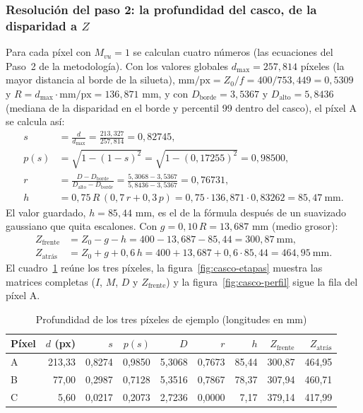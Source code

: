 \subsubsection{Resolución del paso 2: la profundidad del casco, de la disparidad a $Z$}\label{sec:casco-profundidad}

Para cada píxel con $M_{vu}=1$ se calculan cuatro números (las ecuaciones del Paso~2 de la metodología). Con los
valores globales $d_{\max}=257{,}814$ píxeles (la mayor distancia al borde de la silueta),
$\text{mm/px}=Z_0/f=400/753{,}449=0{,}5309$ y $R=d_{\max}\cdot\text{mm/px}=136{,}871$ mm, y con
$D_{\text{borde}}=3{,}5367$ y $D_{\text{alto}}=5{,}8436$ (mediana de la disparidad en el borde y percentil 99 dentro del casco),
el píxel A se calcula así:
\begin{align*}
s&=\frac{d}{d_{\max}}=\frac{213{,}327}{257{,}814}=0{,}82745,\\
p(s)&=\sqrt{1-(1-s)^2}=\sqrt{1-(0{,}17255)^2}=0{,}98500,\\
r&=\frac{D-D_{\text{borde}}}{D_{\text{alto}}-D_{\text{borde}}}=\frac{5{,}3068-3{,}5367}{5{,}8436-3{,}5367}=0{,}76731,\\
h&=0{,}75\,R\,(0{,}7\,r+0{,}3\,p)=0{,}75\cdot136{,}871\cdot0{,}83262=85{,}47\ \text{mm}.
\end{align*}
El valor guardado, $h=85{,}44$ mm, es el de la fórmula después de un suavizado gaussiano que quita escalones. Con
$g=0{,}10\,R=13{,}687$ mm (medio grosor):
\begin{align*}
Z_{\text{frente}}&=Z_0-g-h=400-13{,}687-85{,}44=300{,}87\ \text{mm},\\
Z_{\text{atrás}}&=Z_0+g+0{,}6\,h=400+13{,}687+0{,}6\cdot85{,}44=464{,}95\ \text{mm}.
\end{align*}
El cuadro~\ref{tab:casco-prof} reúne los tres píxeles, la figura~\ref{fig:casco-etapas} muestra las matrices completas
($I$, $M$, $D$ y $Z_{\text{frente}}$) y la figura~\ref{fig:casco-perfil} sigue la fila del píxel A.

\begin{table}[htbp]
\caption{Profundidad de los tres píxeles de ejemplo (longitudes en mm)}
\label{tab:casco-prof}
\centering\small
\begin{tabular}{@{}lrrrrrrrr@{}}
\toprule
Píxel & $d$ (px) & $s$ & $p(s)$ & $D$ & $r$ & $h$ & $Z_{\text{frente}}$ & $Z_{\text{atrás}}$ \\
\midrule
A & 213{,}33 & 0{,}8274 & 0{,}9850 & 5{,}3068 & 0{,}7673 & 85{,}44 & 300{,}87 & 464{,}95 \\
B & 77{,}00 & 0{,}2987 & 0{,}7128 & 5{,}3516 & 0{,}7867 & 78{,}37 & 307{,}94 & 460{,}71 \\
C & 5{,}60 & 0{,}0217 & 0{,}2073 & 2{,}7236 & 0{,}0000 & 7{,}17 & 379{,}14 & 417{,}99 \\
\bottomrule
\end{tabular}
\end{table}

